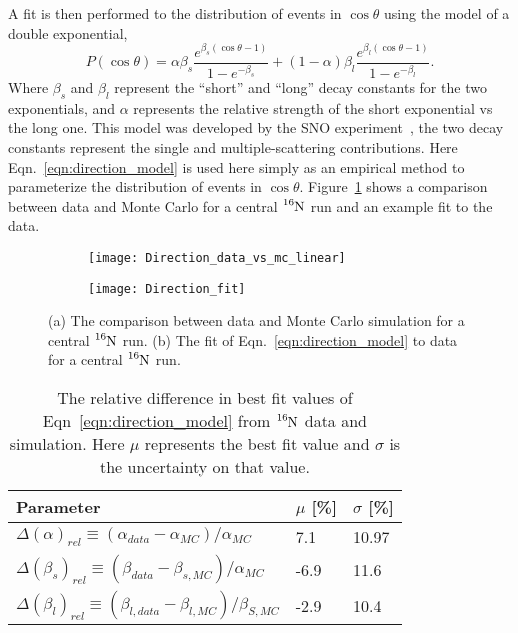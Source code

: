 A fit is then performed to the distribution of events in $\cos\theta$ using
the model of a double exponential,
\begin{equation}
    P(\cos\theta) = \alpha\beta_{s}\frac{e^{\beta_{s}(\cos\theta -1)}}{1-e^{-\beta_{s}}} +
                    (1-\alpha)\beta_{l}\frac{e^{\beta_{l}(\cos\theta - 1)}}{1-e^{-\beta_{l}}}\text{.}
    \label{eqn:direction_model}
\end{equation}
Where $\beta_{s}$ and $\beta_{l}$ represent the ``short'' and ``long'' decay constants
for the two exponentials, and $\alpha$ represents the relative
strength of the short exponential vs the long one.
This model was developed by the SNO experiment~\citep{scott_oser_direction},
the two decay constants represent the single and multiple-scattering
contributions.
Here Eqn.~\eqref{eqn:direction_model} is used here simply as an empirical
method to parameterize the distribution of events in $\cos\theta$.
Figure~\ref{fig:n16_direction} shows a comparison between data and Monte Carlo
for a central $\ce{^{16}N}$ run and an example fit to the data.
\begin{figure}[htbp]
    \centering
    \begin{subfigure}{0.48\textwidth}
    \texttt{[image: Direction\_data\_vs\_mc\_linear]}
    \caption[]{}
    \end{subfigure}
    \hfill
    \begin{subfigure}{0.48\textwidth}
    \texttt{[image: Direction\_fit]}
    \end{subfigure}
        \caption[$\ce{^{16}N}$ Direction Reconstruction Comparison]{(a) The
        comparison between data and Monte Carlo simulation for a central
        $\ce{^{16}N}$ run. (b) The fit of Eqn.~\eqref{eqn:direction_model}
        to data for a central $\ce{^{16}N}$ run.}
\label{fig:n16_direction}
\end{figure}
\begin{table}
    \centering
    \begin{tabular}{p{7cm}|p{2cm}|p{2cm}}
        \hline
        Parameter & $\mu$ [\%] &  $\sigma$ [\%] \\
        \hline
        \hline
        $\Delta(\alpha)_{rel} \equiv (\alpha_{data} - \alpha_{MC}) / \alpha_{MC}$  & 7.1 & 10.97 \\
        $\Delta(\beta_s)_{rel} \equiv (\beta_{data} - \beta_{s, MC}) / \alpha_{MC}$     & -6.9 & 11.6 \\
        $\Delta(\beta_l)_{rel} \equiv (\beta_{l, data} - \beta_{l, MC}) / \beta_{S, MC}$      & -2.9 & 10.4 \\
        \hline
    \end{tabular}
    \caption[Relative Uncertainties for Direction Reconstruction]{The
    relative difference in best fit values of Eqn~\eqref{eqn:direction_model}
    from $\ce{^{16}N}$ data and simulation. Here $\mu$ represents the
    best fit value and $\sigma$ is the uncertainty on that value.}
    \label{tbl:direction_recon}
\end{table}

